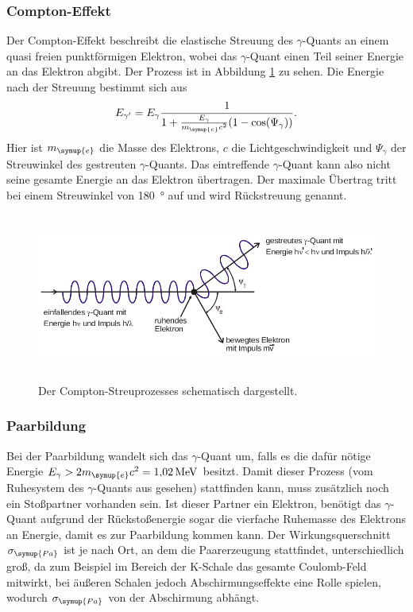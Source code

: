 \subsubsection{Compton-Effekt}
\label{sec:ComEffekt}
Der Compton-Effekt beschreibt die elastische Streuung des $\gamma$-Quants an einem quasi freien punktförmigen Elektron, wobei das $\gamma$-Quant einen Teil seiner Energie an das Elektron abgibt.
Der Prozess ist in Abbildung \ref{fig:Compton} zu sehen.
Die Energie nach der Streuung bestimmt sich aus
\begin{equation}
E_{\gamma'}=E_{\gamma}\frac{1}{1+\frac{E_{\gamma}}{m_{\symup{e}} c^2}(1-\cos(\Psi_{\gamma}))}.
\end{equation}
Hier ist $m_{\symup{e}}$ die Masse des Elektrons, $c$ die Lichtgeschwindigkeit und $\Psi_{\gamma}$ der Streuwinkel des gestreuten $\gamma$-Quants.
Das eintreffende $\gamma$-Quant kann also nicht seine gesamte Energie an das Elektron übertragen.
Der maximale Übertrag tritt bei einem Streuwinkel von \SI{180}{\degree} auf und wird Rückstreuung genannt.
 \begin{figure}
   \centering
   \includegraphics[height=5.5cm]{content/pictures/Compton.png}
   \caption{Der Compton-Streuprozesses schematisch dargestellt.\cite{V18}}
   \label{fig:Compton}
 \end{figure}

\subsubsection{Paarbildung}
\label{sec:Paar}
Bei der Paarbildung wandelt sich das $\gamma$-Quant um, falls es die dafür nötige Energie $E_{\gamma}>2m_{\symup{e}}c^2 = \SI{1.02}{\mega\electronvolt}$ \cite{Theorie} besitzt.
Damit dieser Prozess (vom Ruhesystem des $\gamma$-Quants aus gesehen) stattfinden kann, muss zusätzlich noch ein Stoßpartner vorhanden sein.
Ist dieser Partner ein Elektron, benötigt das $\gamma$-Quant aufgrund der Rückstoßenergie sogar die vierfache Ruhemasse des Elektrons an Energie, damit es zur Paarbildung kommen kann.
Der Wirkungsquerschnitt $\sigma_{\symup{Pa}}$ ist je nach Ort, an dem die Paarerzeugung stattfindet, unterschiedlich groß, da zum Beispiel im Bereich der K-Schale das gesamte Coulomb-Feld mitwirkt, bei äußeren Schalen
jedoch Abschirmungseffekte eine Rolle spielen, wodurch $\sigma_{\symup{Pa}}$ von der Abschirmung abhängt.

